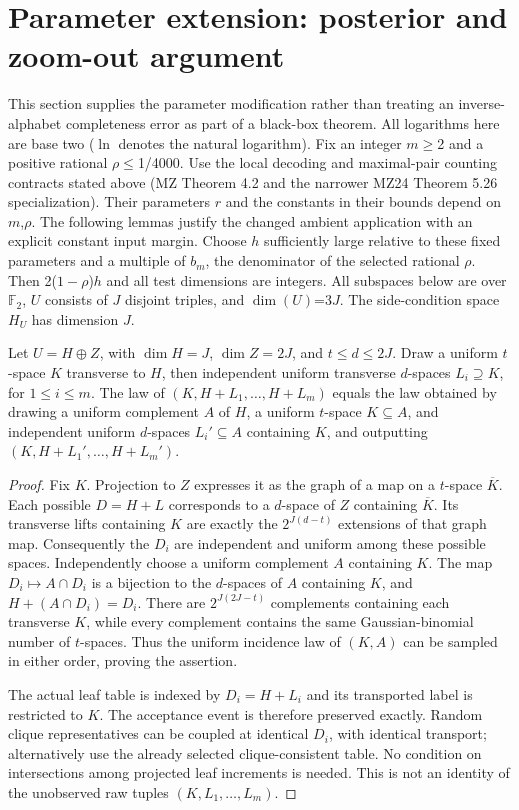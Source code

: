\section{Parameter extension: posterior and zoom-out argument}\label{sec:6}
This section supplies the parameter modification rather than treating an inverse-alphabet completeness error as part of a black-box theorem. All logarithms here are base two (\(\ln\) denotes the natural logarithm). Fix an integer \(m\)\(\ge\)2 and a positive rational \(\rho\)\(\le\)1/4000. Use the local decoding and maximal-pair counting contracts stated above (MZ Theorem 4.2 and the narrower MZ24 Theorem 5.26 specialization). Their parameters \(r\) and the constants in their bounds depend on \(m\),\(\rho\). The following lemmas justify the changed ambient application with an explicit constant input margin. Choose \(h\) sufficiently large relative to these fixed parameters and a multiple of \(b_m\), the denominator of the selected rational \(\rho\). Then 2(\(1-\rho\))\(h\) and all test dimensions are integers. All subspaces below are over \(\mathbb F_2\), \(U\) consists of \(J\) disjoint triples, and \(\dim(U)\)=3\(J\). The side-condition space \(H_U\) has dimension \(J\).

\begin{lemma}\label{lem:complement}
Let $U=H\oplus Z$, with $\dim H=J$, $\dim Z=2J$, and $t\le d\le2J$.
Draw a uniform $t$-space $K$ transverse to $H$, then independent uniform
transverse $d$-spaces $L_i\supseteq K$, for $1\le i\le m$.
The law of $(K,H+L_1,\ldots,H+L_m)$ equals the law obtained by drawing
a uniform complement $A$ of $H$, a uniform $t$-space $K\subseteq A$,
and independent uniform $d$-spaces $L_i'\subseteq A$ containing $K$,
and outputting $(K,H+L_1',\ldots,H+L_m')$.
\end{lemma}
\begin{proof}
Fix $K$. Projection to $Z$ expresses it as the graph of a map on a
$t$-space $\overline K$. Each possible $D=H+L$ corresponds to a
$d$-space of $Z$ containing $\overline K$. Its transverse lifts containing
$K$ are exactly the $2^{J(d-t)}$ extensions of that graph map.
Consequently the $D_i$ are independent and uniform among these possible
spaces. Independently choose a uniform complement $A$ containing $K$.
The map $D_i\mapsto A\cap D_i$ is a bijection to the $d$-spaces of $A$
containing $K$, and $H+(A\cap D_i)=D_i$.
There are $2^{J(2J-t)}$ complements containing each transverse $K$,
while every complement contains the same Gaussian-binomial number of
$t$-spaces. Thus the uniform incidence law of $(K,A)$ can be sampled
in either order, proving the assertion.

The actual leaf table is indexed by $D_i=H+L_i$ and its transported
label is restricted to $K$. The acceptance event is therefore preserved
exactly. Random clique representatives can be coupled at identical
$D_i$, with identical transport; alternatively use the already selected
clique-consistent table. No condition on intersections among projected
leaf increments is needed. This is not an identity of the unobserved
raw tuples $(K,L_1,\ldots,L_m)$.
\end{proof}


